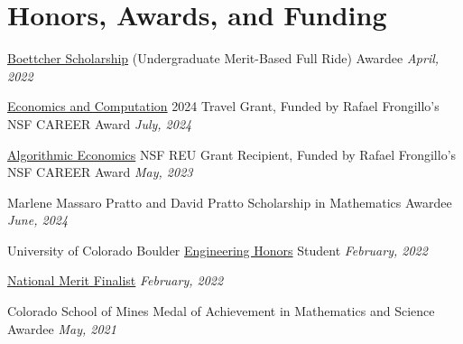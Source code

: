 \documentclass[a4paper,20pt]{article}
\begin{document}
    \vspace{-5pt}
    \section{Honors, Awards, and Funding}
    \begin{description}[font=$\bullet$]
    \item {\href{https://boettcherfoundation.org}{Boettcher Scholarship} (Undergraduate Merit-Based Full Ride) Awardee \hfill \textit{April, 2022}}
    \vspace{-5pt}
    \item {\href{https://ec24.sigecom.org/index.html}{Economics and Computation} 2024 Travel Grant, Funded by Rafael Frongillo's NSF CAREER Award \hfill \textit{July, 2024}}
    \vspace{-5pt}
    \item {\href{https://www.colorado.edu/cs-theory/alg-econ}{Algorithmic Economics} NSF REU Grant Recipient, Funded by Rafael Frongillo's NSF CAREER Award \hfill \textit{May, 2023}}
    \vspace{-5pt}
    \item {Marlene Massaro Pratto and David Pratto Scholarship in Mathematics Awardee \hfill \textit{June, 2024}}
    \vspace{-5pt}
    \item {University of Colorado Boulder \href{https://cuengineeringhonors.com}{Engineering Honors} Student \hfill \textit{February, 2022}}
    \vspace{-5pt}
    \item {\href{https://www.nationalmerit.org}{National Merit Finalist} \hfill \textit{February, 2022}}
    \vspace{-5pt}
    \item {Colorado School of Mines Medal of Achievement in Mathematics and Science Awardee \hfill \textit{May, 2021}}
    \end{description}
    
\end{document}
